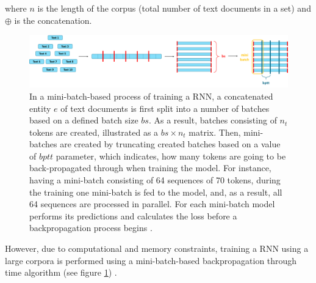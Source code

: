 where $n$ is the length of the corpus (total number of text documents in a set) and $\oplus$ is the concatenation. 

\begin{figure}[]
\centering
\includegraphics[scale=0.45]{figures/minibatch.png}
\caption{In a mini-batch-based process of training a RNN, a concatenated entity $e$ of text documents is first split into a number of batches based on a defined batch size $bs$. As a result, batches consisting of $n_t$ tokens are created,  illustrated as a $bs \times n_t$ matrix. Then, mini-batches are created by truncating created batches based on a value of $bptt$ parameter, which indicates, how many tokens are going to be back-propagated through when training the model. For instance, having a mini-batch consisting of 64 sequences of 70 tokens, during the training one mini-batch is fed to the model, and, as a result, all 64 sequences are processed in parallel. For each mini-batch model performs its predictions and calculates the loss before a backpropagation process begins \cite{ulmfit:berlin}.}
\label{corpus:minibatch}
\end{figure}

However, due to computational and memory constraints, training a RNN using a large corpora is performed using a mini-batch-based backpropagation through time algorithm (see figure \ref{corpus:minibatch}) \cite{ulmfit:berlin}.




